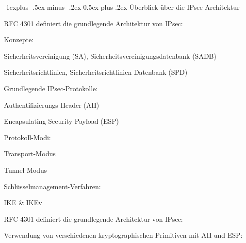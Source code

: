 \documentclass[a4paper]{article}
\makeatletter
\renewcommand{\subsection}{\@startsection{subsection}{2}{0mm}%
 {-1explus -.5ex minus -.2ex}%
 {0.5ex plus .2ex}%
 {\normalfont\normalsize\bfseries}}
\makeatother
\begin{document}
\begin{multicols}{3}


      \subsection{Überblick über die
            IPsec-Architektur}

      \begin{itemize*}
            \item RFC 4301 definiert die grundlegende Architektur von IPsec:
            \begin{itemize*}
                  \item Konzepte:
                  \begin{itemize*}
                        \item Sicherheitsvereinigung (SA), Sicherheitsvereinigungsdatenbank (SADB)
                        \item Sicherheitsrichtlinien, Sicherheitsrichtlinien-Datenbank (SPD)
                  \end{itemize*}
                  \item Grundlegende IPsec-Protokolle:
                  \begin{itemize*}
                        \item Authentifizierungs-Header (AH)
                        \item Encapsulating Security Payload (ESP)
                  \end{itemize*}
                  \item Protokoll-Modi:
                  \begin{itemize*}
                        \item Transport-Modus
                        \item Tunnel-Modus
                  \end{itemize*}
                  \item Schlüsselmanagement-Verfahren:
                  \begin{itemize*}
                        \item IKE \& IKEv
                  \end{itemize*}
            \end{itemize*}
            \item RFC 4301 definiert die grundlegende Architektur von IPsec:
            \begin{itemize*}
                  \item Verwendung von verschiedenen kryptographischen Primitiven mit AH und ESP:

\end{itemize*}
\end{itemize*}
\end{multicols}
\end{document}
